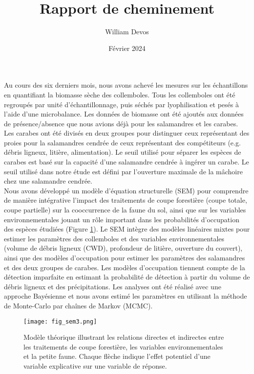 \documentclass[12pt, letterpaper]{article}
\title{Rapport de cheminement}
\author{William Devos}
\date{Février 2024}
\begin{document}
\maketitle

Au cours des six derniers mois, nous avons achevé les mesures sur les échantillons en quantifiant 
la biomasse sèche des collemboles. Tous les collemboles ont été regroupés par unité d'échantillonnage, 
puis séchés par lyophilisation et pesés à l'aide d'une microbalance. Les données de biomasse ont été ajoutés 
aux données de présence/absence que nous avions déjà pour les salamandres et les carabes. Les carabes ont été 
divisés en deux groupes pour distinguer ceux représentant des proies pour la salamandres cendrée de ceux représentant des 
compétiteurs (e.g. débris ligneux, litière, alimentation). 
Le seuil utilisé pour séparer les espèces de carabes est basé sur la capacité d'une salamandre cendrée à ingérer un carabe.
Le seuil utilisé dans notre étude est défini par l'ouverture maximale de la mâchoire chez une salamandre cendrée. \\

Nous avons développé un modèle d'équation structurelle (SEM) pour comprendre de manière intégrative l'impact des 
traitements de coupe forestière (coupe totale, coupe partielle) sur la cooccurrence de la faune du sol, 
ainsi que sur les variables environnementales jouant un rôle important dans les probabilités d'occupation 
des espèces étudiées (Figure \ref*{fig:SEM}). Le SEM intègre des modèles linéaires mixtes 
pour estimer les paramètres des collemboles et des variables environnementales (volume de débris ligneux (CWD), 
profondeur de litière, ouverture du couvert), ainsi que des modèles d'occupation pour estimer les paramètres des 
salamandres et des deux groupes de carabes. Les modèles d'occupation tiennent compte de la détection imparfaite en 
estimant la probabilité de détection à partir du volume de débris ligneux et des précipitations. 
Les analyses ont été réalisé avec une approche Bayésienne et nous avons estimé les paramètres en utilisant la méthode de Monte-Carlo par chaînes de Markov (MCMC).


\pagebreak

\begin{figure}[ht!]
	\centering
	\texttt{[image: fig\_sem3.png]}
	\caption{Modèle théorique illustrant les relations directes et indirectes entre les traitements de coupe forestière, les variables environnementales et la petite faune. 
    Chaque flèche indique l'effet potentiel d'une variable explicative sur une variable de réponse.}
	\label{fig:SEM}
	\end{figure}  
\end{document}
